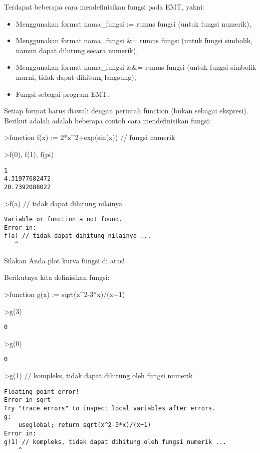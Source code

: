 \documentclass[
]{book}
\providecommand{\tightlist}{%
  \setlength{\itemsep}{0pt}\setlength{\parskip}{0pt}}
\begin{document}
Terdapat beberapa cara mendefinisikan fungsi pada EMT, yakni:

\begin{itemize}
\tightlist
\item
  Menggunakan format nama\_fungsi := rumus fungsi (untuk fungsi numerik),
\item
  Menggunakan format nama\_fungsi \&= rumus fungsi (untuk fungsi simbolik, namun dapat dihitung secara numerik),
\item
  Menggunakan format nama\_fungsi \&\&= rumus fungsi (untuk fungsi simbolik murni, tidak dapat dihitung langsung),
\item
  Fungsi sebagai program EMT.
\end{itemize}

Setiap format harus diawali dengan perintah function (bukan sebagai ekspresi). Berikut adalah adalah beberapa contoh cara mendefinisikan fungsi:

\textgreater function f(x) := 2*x\^{}2+exp(sin(x)) // fungsi numerik

\textgreater f(0), f(1), f(pi)

\begin{verbatim}
1
4.31977682472
20.7392088022
\end{verbatim}

\textgreater f(a) // tidak dapat dihitung nilainya

\begin{verbatim}
Variable or function a not found.
Error in:
f(a) // tidak dapat dihitung nilainya ...
   ^
\end{verbatim}

Silakan Anda plot kurva fungsi di atas!

Berikutnya kita definisikan fungsi:

\textgreater function g(x) := sqrt(x\^{}2-3*x)/(x+1)

\textgreater g(3)

\begin{verbatim}
0
\end{verbatim}

\textgreater g(0)

\begin{verbatim}
0
\end{verbatim}

\textgreater g(1) // kompleks, tidak dapat dihitung oleh fungsi numerik

\begin{verbatim}
Floating point error!
Error in sqrt
Try "trace errors" to inspect local variables after errors.
g:
    useglobal; return sqrt(x^2-3*x)/(x+1) 
Error in:
g(1) // kompleks, tidak dapat dihitung oleh fungsi numerik ...
    ^
\end{verbatim}
\end{document}
